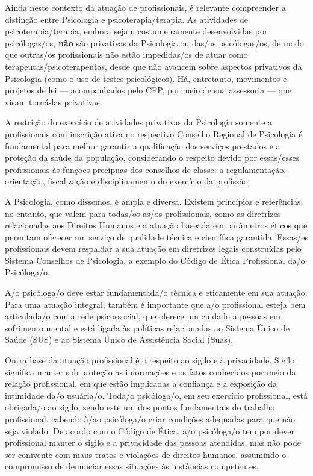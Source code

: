 \documentclass[a5paper, twoside, symmetric, nohyper]{tufte-book}
\begin{document}
Ainda neste contexto da atuação de profissionais, é relevante
compreender a distinção entre Psicologia e psicoterapia/terapia. As
atividades de psicoterapia/terapia, embora sejam costumeiramente
desenvolvidas por psicólogas/os, \textbf{não} são privativas da
Psicologia ou das/os psicólogas/os, de modo que outras/os profissionais
não estão impedidas/os de atuar como terapeutas/psicoterapeutas, desde
que não avancem sobre aspectos privativos da Psicologia (como o uso de
testes psicológicos). Há, entretanto, movimentos e projetos de lei ---
acompanhados pelo CFP, por meio de sua assessoria --- que visam
torná-las privativas.

A restrição do exercício de atividades privativas da Psicologia somente
a profissionais com inscrição ativa no respectivo Conselho Regional de
Psicologia é fundamental para melhor garantir a qualificação dos
serviços prestados e a proteção da saúde da população, considerando o
respeito devido por essas/esses profissionais às funções precípuas dos
conselhos de classe: a regulamentação, orientação, fiscalização e
disciplinamento do exercício da profissão.

A Psicologia, como dissemos, é ampla e diversa. Existem princípios e
referências, no entanto, que valem para todas/os as/os profissionais,
como as diretrizes relacionadas aos Direitos Humanos e a atuação baseada
em parâmetros éticos que permitam oferecer um serviço de qualidade
técnica e científica garantida. Essas/es profissionais devem respaldar a
sua atuação em diretrizes legais construídas pelo Sistema Conselhos de
Psicologia, a exemplo do Código de Ética Profissional da/o Psicóloga/o.

A/o psicóloga/o deve estar fundamentada/o técnica e eticamente em sua
atuação. Para uma atuação integral, também é importante que a/o
profissional esteja bem articulada/o com a rede psicossocial, que
oferece um cuidado a pessoas em sofrimento mental e está ligada às
políticas relacionadas ao Sistema Único de Saúde (SUS) e ao Sistema
Único de Assistência Social (Suas).

Outra base da atuação profissional é o respeito ao sigilo e à
privacidade. Sigilo significa manter sob proteção as informações e os
fatos conhecidos por meio da relação profissional, em que estão
implicadas a confiança e a exposição da intimidade da/o usuária/o.
Toda/o psicóloga/o, em seu exercício profissional, está obrigada/o ao
sigilo, sendo este um dos pontos fundamentais do trabalho profissional,
cabendo à/ao psicóloga/o criar condições adequadas para que não seja
violado. De acordo com o Código de Ética, a/o psicóloga/o tem por dever
profissional manter o sigilo e a privacidade das pessoas atendidas, mas
não pode ser conivente com maus-tratos e violações de direitos humanos,
assumindo o compromisso de denunciar essas situações às instâncias
competentes.
\end{document}
